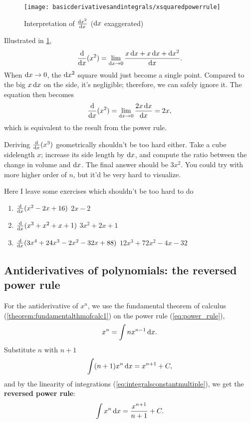 \begin{figure}[b]
    \centering
    \texttt{[image: basicderivativesandintegrals/xsquaredpowerrule]}
	\caption{Interpretation of $\odv{x^2}{x}$ ($\odif{x}$ exaggerated)}
    \label{fig:xsquaredpowerrule}
\end{figure}
Illustrated in \cref{fig:xsquaredpowerrule},
\begin{equation}
    \odv*{(x^2)}{x} = \lim_{\odif{x} \appr 0} \frac{x\odif{x} + x\odif{x} + \odif{x}^2}{\odif{x}}. \label{eq:xsquaredpowerrule}
\end{equation}
When $\odif{x} \appr 0$, the $\odif{x^2}$ square would just become a single point. Compared to the big $x\odif{x}$ on the side, it's negligible; therefore, we can safely ignore it. The equation then becomes
\begin{align*}
    \odv*{(x^2)}{x} = \lim_{\odif{x} \appr 0}\frac{2x\odif{x}}{\odif{x}} = 2x,
\end{align*}
which is equivalent to the result from the power rule.

Deriving $\odv*{(x^3)}{x}$ geometrically shouldn't be too hard either. Take a cube sidelength $x$; increase its side length by $\odif{x}$, and compute the ratio between the change in volume and $\odif{x}$. The final answer should be $3x^2$. You could try with more higher order of $n$, but it'd be very hard to visualize.

Here I leave some exercises which shouldn't be too hard to do
\begin{enumerate}
    \item $\odv*{(x^2 - 2x + 16)}{x}$ \hfill $2x - 2$
    \item $\odv*{(x^3 + x^2 + x + 1)}{x}$ \hfill $3x^2 + 2x + 1$
    \item $\odv*{(3x^4 + 24x^3 - 2x^2 - 32x + 88)}{x}$ \hfill $12x^3 + 72x^2 - 4x - 32$
\end{enumerate}

\subsection{Antiderivatives of polynomials: the reversed power rule}

For the antiderivative of $x^n$, we use the fundamental theorem of calculus (\cref{theorem:fundamentalthmofcalc1}) on the power rule (\cref{eq:power_rule}),
\begin{equation*}
    x^n = \int nx^{n - 1} \odif{x}.
\end{equation*}
Substitute $n$ with $n + 1$
\begin{equation*}
    \int (n + 1)x^{n}\odif{x} = x^{n + 1} + C,
\end{equation*}
and by the linearity of integrations (\cref{eq:integralsconstantmultiple}), we get the \textbf{reversed power rule}:
\begin{equation}
	\int x^{n}\odif{x} = \frac{x^{n + 1}}{n + 1} + C. \label{eq:reversed-power-rule}
\end{equation}

